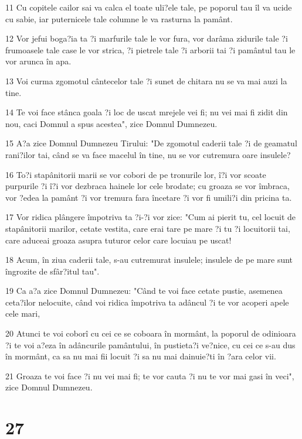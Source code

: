\par 11 Cu copitele cailor sai va calca el toate uli?ele tale, pe poporul tau îl va ucide cu sabie, iar puternicele tale columne le va rasturna la pamânt.
\par 12 Vor jefui boga?ia ta ?i marfurile tale le vor fura, vor darâma zidurile tale ?i frumoasele tale case le vor strica, ?i pietrele tale ?i arborii tai ?i pamântul tau le vor arunca în apa.
\par 13 Voi curma zgomotul cântecelor tale ?i sunet de chitara nu se va mai auzi la tine.
\par 14 Te voi face stânca goala ?i loc de uscat mrejele vei fi; nu vei mai fi zidit din nou, caci Domnul a spus acestea", zice Domnul Dumnezeu.
\par 15 A?a zice Domnul Dumnezeu Tirului: "De zgomotul caderii tale ?i de geamatul rani?ilor tai, când se va face macelul în tine, nu se vor cutremura oare insulele?
\par 16 To?i stapânitorii marii se vor cobori de pe tronurile lor, î?i vor scoate purpurile ?i î?i vor dezbraca hainele lor cele brodate; cu groaza se vor îmbraca, vor ?edea la pamânt ?i vor tremura fara încetare ?i vor fi umili?i din pricina ta.
\par 17 Vor ridica plângere împotriva ta ?i-?i vor zice: "Cum ai pierit tu, cel locuit de stapânitorii marilor, cetate vestita, care erai tare pe mare ?i tu ?i locuitorii tai, care aduceai groaza asupra tuturor celor care locuiau pe uscat!
\par 18 Acum, în ziua caderii tale, s-au cutremurat insulele; insulele de pe mare sunt îngrozite de sfâr?itul tau".
\par 19 Ca a?a zice Domnul Dumnezeu: "Când te voi face cetate pustie, asemenea ceta?ilor nelocuite, când voi ridica împotriva ta adâncul ?i te vor acoperi apele cele mari,
\par 20 Atunci te voi coborî cu cei ce se coboara în mormânt, la poporul de odinioara ?i te voi a?eza în adâncurile pamântului, în pustieta?i ve?nice, cu cei ce s-au dus în mormânt, ca sa nu mai fii locuit ?i sa nu mai dainuie?ti în ?ara celor vii.
\par 21 Groaza te voi face ?i nu vei mai fi; te vor cauta ?i nu te vor mai gasi în veci", zice Domnul Dumnezeu.

\chapter{27}

